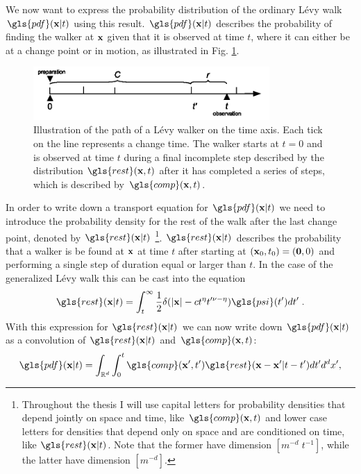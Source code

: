 We now want to express the probability distribution of the ordinary L\'evy walk $\gls{pdf}(\ve{x}|t)$ using this result. $\gls{pdf}(\ve{x}|t)$ describes the probability of finding the walker at $\mathbf{ x }$ given that it is observed at time $t$, where it can either be at a change point or in motion, as illustrated in Fig. \ref{fig:pdfOrdinary}. 
%
\begin{figure}
\begin{center}
\includegraphics[width=90mm]{pics/timelineOrdinary.png}
\caption{Illustration of the path of a L\'evy walker on the time axis. Each tick on the line represents a change time. The walker starts at $t=0$ and is observed at time $t$ during a final incomplete step described by the distribution $\gls{rest}(\ve{x},t)$ after it has completed a series of steps, which is described by $\gls{comp}(\ve{x},t)$. 
\label{fig:pdfOrdinary}}
\end{center}
\end{figure}
%
In order to write down a transport equation for $\gls{pdf}(\ve{x}|t)$ we need to introduce the probability density for the rest of the walk after the last change point, denoted by $\gls{rest}(\ve{x}|t)$
\footnote{
Throughout the thesis I will use capital letters for probability densities that depend jointly on space and time, like $\gls{comp}(\ve{x},t)$ and lower case letters for densities that depend only on space and are conditioned on time, like $\gls{rest}(\ve{x}|t)$. Note that the former have dimension $[m^{-d} \; t^{-1}]$, while the latter have dimension $[m^ {-d}]$.
}. 
$\gls{rest}(\ve{x}|t)$ describes the probability that a walker is be found at $\mathbf{ x }$ at time $t$ after starting at $(\mathbf{ x }_0,t_0) =(\mathbf{ 0 },0)$ and performing a single step of duration equal or larger than $t$. In the case of the generalized L\'evy walk this can be cast into the equation
%
\begin{align}
 \gls{rest}(\ve{x}|t) =  \int_t^\infty \frac{1}{2} \delta(|\ve{x}| - c t^{\eta}t'^{\nu-\eta}) \gls{psi}(t') dt' \; \label{eqn:defR} .
\end{align}
%
With this expression for $\gls{rest}(\ve{x}|t)$ we can now write down $\gls{pdf}(\ve{x}|t)$ as a convolution of $\gls{rest}(\ve{x}|t)$ and $\gls{comp}(\ve{x},t)$:
%
\begin{align}
\gls{pdf}(\ve{x}|t) = \int_{\mathbb{R}^{d}} \int_0^t  \gls{comp}(\ve{x}',t') \gls{rest}(\ve{x}-\ve{x}'|t-t') d t' d^{d}x' ,
\end{align}
